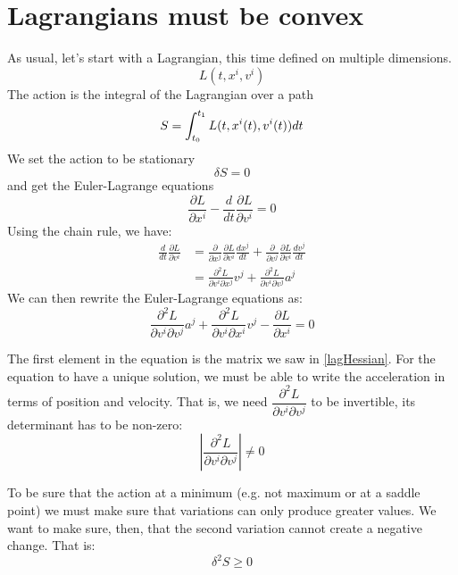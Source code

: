 \documentclass[aps,pra,10pt,floatfix,nofootinbib]{revtex4-1}
\theoremstyle{definition}
\begin{document}
\section{Lagrangians must be convex}

As usual, let's start with a Lagrangian, this time defined on multiple dimensions.
\begin{equation}
L(t, x^i, v^i)
\end{equation}
The action is the integral of the Lagrangian over a path
\begin{equation}
S = \int_{t_0}^{t_1} L(t, x^i(t), v^i(t)) dt \\
\end{equation}
We set the action to be stationary
\begin{equation}
\delta S = 0
\end{equation}
and get the Euler-Lagrange equations
\begin{equation}
\label{EulerLagrange}
\frac{\partial L}{\partial x^i} - \frac{d}{dt} \frac{\partial L}{\partial v^i} = 0
\end{equation}
Using the chain rule, we have:
\begin{align*}
\frac{d}{dt} \frac{\partial L}{\partial v^i} &= \frac{\partial}{\partial x^j} \frac{\partial L}{\partial v^i} \frac{dx^j}{dt} + \frac{\partial}{\partial v^j}  \frac{\partial L}{\partial v^i} \frac{dv^j}{dt} \\
&= \frac{\partial^2 L}{\partial v^i \partial x^j} v^j + \frac{\partial^2 L}{\partial v^i \partial v^j} a^j
\end{align*}
We can then rewrite the Euler-Lagrange equations as:
\begin{equation}
\label{EulerLagrangeMod}
\frac{\partial^2 L}{\partial v^i \partial v^j} a^j + \frac{\partial^2 L}{\partial v^i \partial x^i} v^j - \frac{\partial L}{\partial x^i}=0
\end{equation}

The first element in the equation is the matrix we saw in \eqref{lagHessian}. For the equation to have a unique solution, we must be able to write the acceleration in terms of position and velocity. That is, we need $\dfrac{\partial^2 L}{\partial v^i \partial v^j}$ to be invertible, its determinant has to be non-zero:
\begin{equation}
\label{lagHessianNonSingular}
\left|\frac{\partial^2 L}{\partial v^i \partial v^j}\right| \neq 0
\end{equation}

To be sure that the action at a minimum (e.g. not maximum or at a saddle point) we must make sure that variations can only produce greater values. We want to make sure, then, that the second variation cannot create a negative change. That is:
\begin{equation}
\delta^2 S \geq 0
\end{equation}
\end{document}
